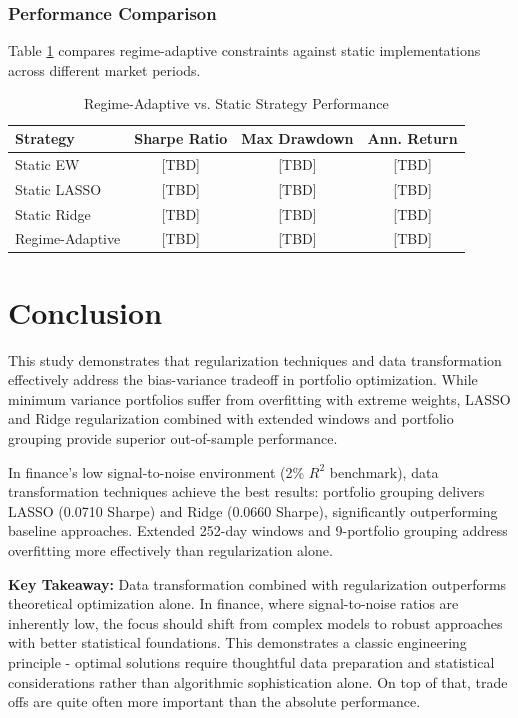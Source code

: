 \documentclass[12pt]{article}
\begin{document}
\subsubsection{Performance Comparison}
Table \ref{tab:regime_performance} compares regime-adaptive constraints against static implementations across different market periods.

\begin{table}[h]
\centering
\caption{Regime-Adaptive vs. Static Strategy Performance}
\label{tab:regime_performance}
\begin{tabular}{lccc}
\hline
Strategy & Sharpe Ratio & Max Drawdown & Ann. Return \\
\hline
Static EW & [TBD] & [TBD] & [TBD] \\
Static LASSO & [TBD] & [TBD] & [TBD] \\
Static Ridge & [TBD] & [TBD] & [TBD] \\
Regime-Adaptive & [TBD] & [TBD] & [TBD] \\
\hline
\end{tabular}
\end{table}

\section{Conclusion}

This study demonstrates that regularization techniques and data transformation effectively address the bias-variance tradeoff in portfolio optimization. While minimum variance portfolios suffer from overfitting with extreme weights, LASSO and Ridge regularization combined with extended windows and portfolio grouping provide superior out-of-sample performance.

In finance's low signal-to-noise environment (2\% $R^2$ benchmark), data transformation techniques achieve the best results: portfolio grouping delivers LASSO (0.0710 Sharpe) and Ridge (0.0660 Sharpe), significantly outperforming baseline approaches. Extended 252-day windows and 9-portfolio grouping address overfitting more effectively than regularization alone.

\textbf{Key Takeaway:} Data transformation combined with regularization outperforms theoretical optimization alone. In finance, where signal-to-noise ratios are inherently low, the focus should shift from complex models to robust approaches with better statistical foundations. This demonstrates a classic engineering principle - optimal solutions require thoughtful data preparation and statistical considerations rather than algorithmic sophistication alone. On top of that, trade offs are quite often more important than the absolute performance.
\end{document}
